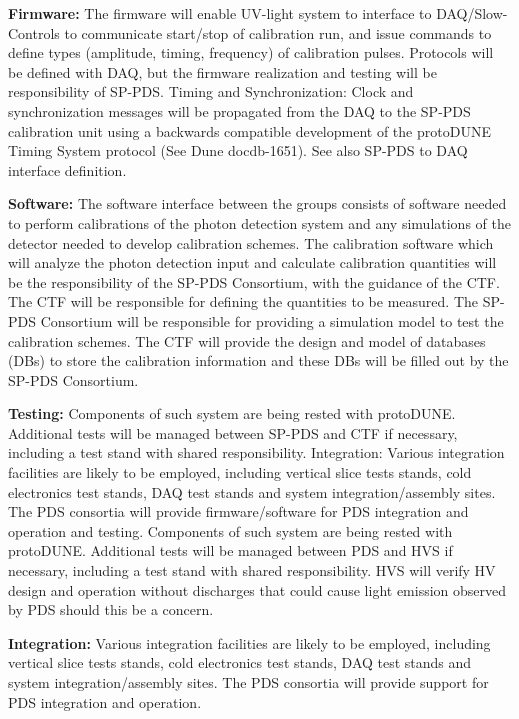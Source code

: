 \textbf{Firmware:} The firmware will enable UV-light system to interface to DAQ/Slow-Controls to communicate start/stop of calibration run, and issue commands to define types (amplitude, timing, frequency) of calibration pulses. Protocols will be defined with DAQ, but the firmware realization and testing will be responsibility of SP-PDS. 
Timing and Synchronization: Clock and synchronization messages will be propagated from the DAQ to the SP-PDS calibration unit using a backwards compatible development of the protoDUNE Timing System protocol (See Dune docdb-1651). See also SP-PDS to DAQ interface definition.

\textbf{Software:} The software interface between the groups consists of software needed to perform calibrations of the photon detection system and any simulations of the detector needed to develop calibration schemes. The calibration software which will analyze the photon detection input and calculate calibration quantities will be the responsibility of the SP-PDS Consortium, with the guidance of the CTF. The CTF will be responsible for defining the quantities to be measured. The SP-PDS Consortium will be responsible for providing a simulation model to test the calibration schemes. The CTF will provide the design and model of databases (DBs) to store the calibration information and these DBs will be filled out by the SP-PDS Consortium.

\textbf{Testing: }Components of such system are being rested with protoDUNE. Additional tests will be managed between SP-PDS and CTF if necessary, including a test stand with shared responsibility.
Integration: Various integration facilities are likely to be employed, including vertical slice tests stands, cold electronics test stands, DAQ test stands and system integration/assembly sites. The PDS consortia will provide firmware/software for PDS integration and operation and testing. Components of such system are being rested with protoDUNE. Additional tests will be managed between PDS and HVS if necessary, including a test stand with shared responsibility. HVS will verify HV design and operation without discharges that could cause light emission observed by PDS should this be a concern.

\textbf{Integration: } Various integration facilities are likely to be employed, including vertical slice tests stands, cold electronics test stands, DAQ test stands and system integration/assembly sites. The PDS consortia will provide support for PDS integration and operation.

